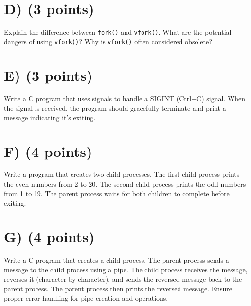 \documentclass{article}
\begin{document}

\section*{D) (3 points)}
Explain the difference between \texttt{fork()} and \texttt{vfork()}.  What are the potential dangers of using \texttt{vfork()}?  Why is \texttt{vfork()} often considered obsolete?


\section*{E) (3 points)}
Write a C program that uses signals to handle a SIGINT (Ctrl+C) signal. When the signal is received, the program should gracefully terminate and print a message indicating it's exiting.



\section*{F) (4 points)}
Write a program that creates two child processes. The first child process prints the even numbers from 2 to 20. The second child process prints the odd numbers from 1 to 19.  The parent process waits for both children to complete before exiting.


\section*{G) (4 points)}
Write a C program that creates a child process. The parent process sends a message to the child process using a pipe. The child process receives the message, reverses it (character by character), and sends the reversed message back to the parent process. The parent process then prints the reversed message.  Ensure proper error handling for pipe creation and operations.

\end{document}
